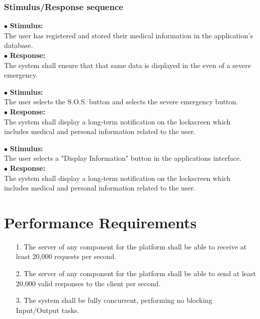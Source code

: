 \documentclass{scrreprt}
\begin{document}
\subsubsection{Stimulus/Response sequence}
\vspace{4mm}
	$\bullet$ \textbf{Stimulus:} \\ \hspace{5mm} The user has registered and stored their medical information in the application's database. \\
	$\bullet$ \textbf{Response:} \\ \hspace{5mm} The system shall ensure that that same data is displayed in the even of a severe emergency. 
	
\vspace{4mm}
	\hspace{-4.75mm} $\bullet$ \textbf{Stimulus:} \\ \hspace{5mm} The user selects the S.O.S. button and selects the severe emergency button. \\
	$\bullet$ \textbf{Response:} \\ \hspace{5mm} The system shall display a long-term notification on the lockscreen which includes medical and personal information related to the user. 

\vspace{4mm}
	\hspace{-4.75mm} $\bullet$ \textbf{Stimulus:} \\ \hspace{5mm} The user selects a "Display Information" button in the applications interface. \\
	$\bullet$ \textbf{Response:} \\ \hspace{5mm} The system shall display a long-term notification on the lockscreen which includes medical and personal information related to the user. 
	

\section{Performance Requirements}
\begin{enumerate}
	\item[1.] The server of any component for the platform shall be able to receive at least 20,000 requests per second.
	\item[2.] The server of any component for the platform shall be able to send at least 20,000 valid responses to the client per second.
	\item[3.] The system shall be fully concurrent, performing no blocking Input/Output tasks.
\end{enumerate}
\end{document}
